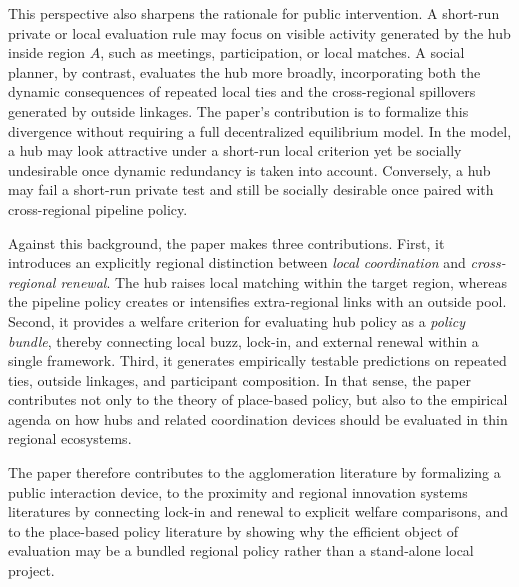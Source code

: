 This perspective also sharpens the rationale for public intervention. A short-run private or local evaluation rule may focus on visible activity generated by the hub inside region $A$, such as meetings, participation, or local matches. A social planner, by contrast, evaluates the hub more broadly, incorporating both the dynamic consequences of repeated local ties and the cross-regional spillovers generated by outside linkages. The paper's contribution is to formalize this divergence without requiring a full decentralized equilibrium model. In the model, a hub may look attractive under a short-run local criterion yet be socially undesirable once dynamic redundancy is taken into account. Conversely, a hub may fail a short-run private test and still be socially desirable once paired with cross-regional pipeline policy.

Against this background, the paper makes three contributions. First, it introduces an explicitly regional distinction between \emph{local coordination} and \emph{cross-regional renewal}. The hub raises local matching within the target region, whereas the pipeline policy creates or intensifies extra-regional links with an outside pool. Second, it provides a welfare criterion for evaluating hub policy as a \emph{policy bundle}, thereby connecting local buzz, lock-in, and external renewal within a single framework. Third, it generates empirically testable predictions on repeated ties, outside linkages, and participant composition. In that sense, the paper contributes not only to the theory of place-based policy, but also to the empirical agenda on how hubs and related coordination devices should be evaluated in thin regional ecosystems.

The paper therefore contributes to the agglomeration literature by formalizing a public interaction device, to the proximity and regional innovation systems literatures by connecting lock-in and renewal to explicit welfare comparisons, and to the place-based policy literature by showing why the efficient object of evaluation may be a bundled regional policy rather than a stand-alone local project.
